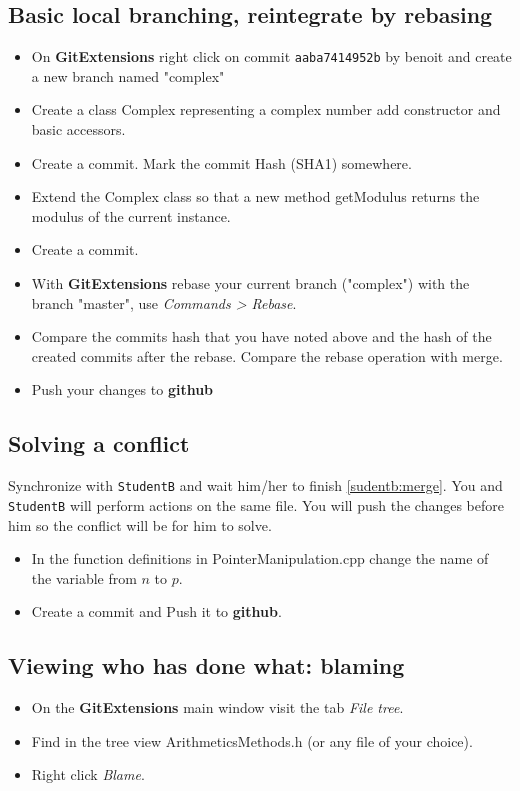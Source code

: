 \documentclass[11pt,amsfonts,amsmath]{article}
\begin{document}
\subsection{Basic local branching, reintegrate by rebasing}\label{sudenta:rebase}
\begin{itemize}
\item On \textbf{GitExtensions} right click on commit \texttt{aaba7414952b} by benoit and create a new branch named "complex"
\item Create a class Complex representing a complex number add constructor and basic accessors.
\item Create a commit. Mark the commit Hash (SHA1) somewhere.
\item Extend the Complex class so that a new method getModulus returns the modulus of the current instance.
\item Create a commit.
\item With \textbf{GitExtensions} rebase your current branch ("complex") with the branch "master", use \emph{Commands > Rebase}.
\item Compare the commits hash that you have noted above and the hash of the created commits after the rebase. Compare the rebase operation with merge.
\item Push your changes to \textbf{github}
\end{itemize}

\subsection{Solving a conflict}\label{studenta:conflict}
Synchronize with \texttt{StudentB} and wait him/her to finish \ref{sudentb:merge}. You and \texttt{StudentB} will perform actions on the same file. You will push the changes before him so the conflict will be for him to solve.
\begin{itemize}
\item In the function definitions in PointerManipulation.cpp change the name of the variable from $n$ to $p$.
\item Create a commit and Push it to \textbf{github}.
\end{itemize}

\subsection{Viewing who has done what: blaming}\label{sudenta:blaming}
\begin{itemize}
\item On the \textbf{GitExtensions} main window visit the tab \emph{File tree}.
\item Find in the tree view ArithmeticsMethods.h (or any file of your choice).
\item Right click \emph{Blame}.
\end{itemize}
\end{document}

